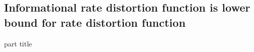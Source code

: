 \subsection{Informational rate distortion function is lower bound for rate distortion function}
\begin{frame}
 \vspace{8.0ex}
\begin{center}
\begin{beamercolorbox}[sep=12pt,center]{part title}
\insertsubsection\par
\end{beamercolorbox}
\end{center}
\end{frame}
%
